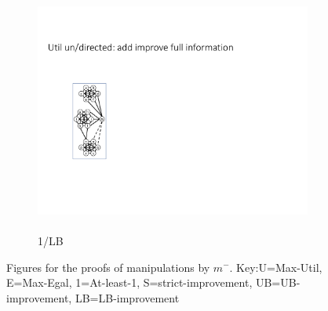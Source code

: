 \documentclass{article}
\begin{document}
\begin{figure}[t]
\begin{subfigure}{0.1\textwidth}
            \label{fig:Egal_undirected_remove}
        \end{subfigure}
        \hfill
        \begin{subfigure}{0.1\textwidth}   \centering
            \includegraphics[page=31,width=\textwidth]{Graphs/graphs.pdf}
            \caption{\\1/LB}
            \label{fig:least1_remove}
        \end{subfigure}
    
    \caption{Figures for the proofs of manipulations by $m^-$. Key:U=Max-Util, E=Max-Egal, 1=At-least-1, S=strict-improvement, UB=UB-improvement, LB=LB-improvement}
    \label{fig:remove_graphs}
\end{figure}
\end{document}
